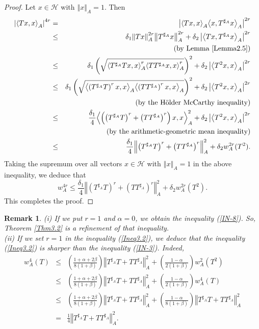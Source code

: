 \documentclass{article}
\newcommand{\bra}[1]{\left(#1\right)}
\newcommand{\seqA}[1]{{\left<#1\right>}_{A}}
\newcommand{\normA}[1]{{\left\Vert#1\right\Vert}_{A}}
\newcommand{\abs}[1]{\left\vert#1\right\vert}
\newcommand {\h}{\mathcal{H}}
\newcommand {\Ta}{T^{\sharp_{A}}}
\newtheorem{remark}[theorem]{Remark}
\begin{document}
\begin{proof} Let $x\in\h$ with $\normA{x}=1$. Then
\begin{eqnarray*}
  \abs{\seqA{Tx,x}}^{4r} &=& \abs{\seqA{Tx,x}\seqA{x,\Ta x}}^{2r}  \\
   &\leq& \delta_1\normA{Tx}^{2r}\normA{\Ta x}^{2r}+\delta_2\abs{\seqA{Tx,\Ta x}}^{2r}\\
   &&\bra{\mbox{by Lemma \ref{Lemma2.5}}}\\
   &\leq& \delta_1\bra{\sqrt{\seqA{\Ta Tx,x}^{r}\seqA{T\Ta x,x}^{r}}}^2+\delta_2\abs{\seqA{T^2x, x}}^{2r}\\
   &\leq&\delta_1\bra{\sqrt{\seqA{\bra{\Ta T}^{r}x,x}\seqA{\bra{T\Ta}^{r} x,x}}}^2+\delta_2\abs{\seqA{T^2x, x}}^{2r}\\
   &&\bra{\mbox{by the H\"older McCarthy inequality}}\\
   &\leq& \frac{\delta_1}{4}\seqA{\bra{\bra{\Ta T}^{r}+\bra{T\Ta}^{r}}x,x}^2 +\delta_2\abs{\seqA{T^2x, x}}^{2r}\\
   &&\bra{\mbox{by the arithmetic-geometric mean inequality}}\\
   &\leq& \frac{\delta_1}{4}\normA{\bra{\Ta T}^{r}+\bra{T\Ta}^{r}}^2+\delta_2w_A^{2r}(T^2).
\end{eqnarray*}
Taking the supremum over all vectors $x\in\h$ with $\normA{x}=1$ in the above inequality, we deduce that
$$w_A^{4r}\leq \frac{\delta_1}{4}\normA{\bra{\Ta T}^{r}+\bra{T\Ta}^{r}}^2+\delta_2w_A^{2r}(T^2).$$
This completes the proof.
\end{proof}
\begin{remark}(i) If we put $r=1$ and $\alpha=0$, we obtain the inequality (\ref{IN-8}). So, Theorem \ref{Thm3.2}
is a refinement of that inequality. \\
(ii) If we set $r=1$ in the inequality (\ref{Ineq3.2}), we deduce that the inequality (\ref{Ineq3.2}) is sharper than the inequality
(\ref{IN-3}). Indeed,
\begin{eqnarray*}
  w_A^{4}(T)&\leq& \bra{\frac{1+\alpha+2\beta}{8(1+\beta)}}\normA{\Ta T+T\Ta}^2+\bra{\frac{1-\alpha}{2(1+\beta)}}w_A^{2}(T^2) \\
   &\leq& \bra{\frac{1+\alpha+2\beta}{8(1+\beta)}}\normA{\Ta T+T\Ta}^2+\bra{\frac{1-\alpha}{2(1+\beta)}}w_A^{4}(T)\\
   &\leq& \bra{\frac{1+\alpha+2\beta}{8(1+\beta)}}\normA{\Ta T+T\Ta}^2+\bra{\frac{1-\alpha}{8(1+\beta)}}\normA{\Ta T+T\Ta}^2\\
   &=& \frac{1}{4}\normA{\Ta T+T\Ta}^2.
\end{eqnarray*}
\end{remark}
\end{document}
